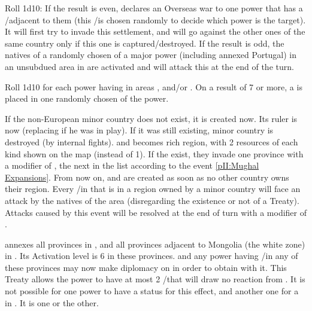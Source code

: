 \phevnt
\aparag Roll 1d10:
\bparag If the result is even, \paysIroquois declares an Overseas war to one
power that has a \COL/\TP adjacent to them (this \COL/\TP is chosen randomly
to decide which power is the target). It will first try to invade this
settlement, and will go against the other ones of the same country only if
this one is captured/destroyed.
\bparag If the result is odd, the natives of a randomly chosen \COL of a major
power (including annexed Portugal) in an unsubdued area in  are activated and will attack this \COL at the end of the turn.




\phevnt
\aparag Roll 1d10 for each power having \COL in areas \granderegionCuba,
\granderegionHaiti and/or \granderegionAntilles. On a result of 7 or more, a
\REVOLT \facemoins is placed in one randomly chosen \COL of the power.





\phevnt
\aparag If the non-European minor country \paysMogol does not exist, it is
created now. Its ruler is now  (replacing \leaderAkbar if
he was in play).
\aparag If it was still existing, minor country \paysVijayanagar is destroyed
(by internal fights).
\aparag \granderegionBengale and \granderegionKarnatika becomes rich region,
with 2 resources of each kind shown on the map (instead of 1).
\aparag If the \paysMogol exist, they invade one province with a modifier of
, the next in the list according to the event \ref{pII:Mughal
  Expansions}.
\aparag From now on, \paysMysore and \paysHyderabad are created as soon as no
other country owns their region.
\aparag Every \TP/\COL in \continentIndia that is in a region owned by a minor
country will face an attack by the natives of the area (disregarding the
existence or not of a Treaty). Attacks caused by this event will be resolved
at the end of turn with a modifier of .





\phevnt
\aparag \paysChina annexes all provinces in \granderegionAmour, and all
provinces adjacent to Mongolia (the white zone) in \granderegionBaikal. Its
Activation level is 6 in these provinces.
\aparag \RUS and any power having \COL/\TP in any of these provinces may now
make diplomacy on \paysChina in order to obtain \dipAT with it. This Treaty
allows the power to have at most 2 \COL/\TP that will draw no reaction from
\paysChina.
\aparag It is not possible for one power to have a \dipAT status for this
effect, and another one for a \TP in \paysChina. It is one or the other.

